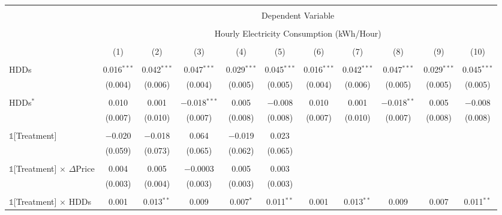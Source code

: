 
\begin{table}[!htbp] \centering 
  \label{Table:Breakdown-of-Average-Treatement-Effects_As-a-Function-of-Rate-Changes_Using-Rate-Changes-in-Peak-Hours_For-Different-Intervals} 
\scriptsize
\begin{longtable}{@{\extracolsep{0pt}}lcccccccccc} 
\\[-1.8ex]\hline 
\hline \\[-1.8ex] 
 & \multicolumn{10}{c}{Dependent Variable} \\ 
\cline{2-11} 
\\[-1.8ex] & \multicolumn{10}{c}{Hourly Electricity Consumption  (kWh/Hour)} \\ 
\\[-1.8ex] & (1) & (2) & (3) & (4) & (5) & (6) & (7) & (8) & (9) & (10)\\ 
\hline \\[-1.8ex] \endhead
 HDDs & 0.016$^{***}$ & 0.042$^{***}$ & 0.047$^{***}$ & 0.029$^{***}$ & 0.045$^{***}$ & 0.016$^{***}$ & 0.042$^{***}$ & 0.047$^{***}$ & 0.029$^{***}$ & 0.045$^{***}$ \\ 
  & (0.004) & (0.006) & (0.004) & (0.005) & (0.005) & (0.004) & (0.006) & (0.005) & (0.005) & (0.005) \\ 
  & & & & & & & & & & \\ 
 HDDs$^{*}$ & 0.010 & 0.001 & $-$0.018$^{***}$ & 0.005 & $-$0.008 & 0.010 & 0.001 & $-$0.018$^{**}$ & 0.005 & $-$0.008 \\ 
  & (0.007) & (0.010) & (0.007) & (0.008) & (0.008) & (0.007) & (0.010) & (0.007) & (0.008) & (0.008) \\ 
  & & & & & & & & & & \\ 
 $\mathbb{1}$[Treatment] & $-$0.020 & $-$0.018 & 0.064 & $-$0.019 & 0.023 &  &  &  &  &  \\ 
  & (0.059) & (0.073) & (0.065) & (0.062) & (0.065) &  &  &  &  &  \\ 
  & & & & & & & & & & \\ 
 $\mathbb{1}$[Treatment] $\times$ $\Delta$Price & 0.004 & 0.005 & $-$0.0003 & 0.005 & 0.003 &  &  &  &  &  \\ 
  & (0.003) & (0.004) & (0.003) & (0.003) & (0.003) &  &  &  &  &  \\ 
  & & & & & & & & & & \\ 
 $\mathbb{1}$[Treatment] $\times$ HDDs & 0.001 & 0.013$^{**}$ & 0.009 & 0.007$^{*}$ & 0.011$^{**}$ & 0.001 & 0.013$^{**}$ & 0.009 & 0.007 & 0.011$^{**}$ \\ 

\end{longtable}
\end{table}
